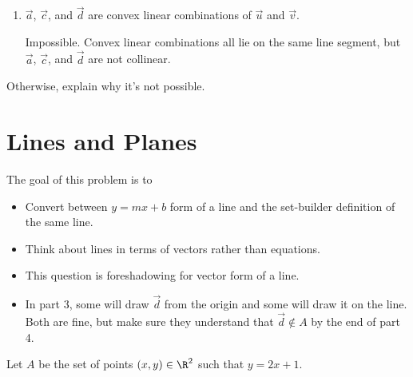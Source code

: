\documentclass{problemset}
\newcommand{\displayonlynewpage}{\begin{displayonly}\newpage\end{displayonly}}
\begin{document}
\begin{parts}
\begin{enumerate}
				\item $\vec a$, $\vec c$, and $\vec d$ are convex linear
					combinations of $\vec u$ and $\vec v$.
				\begin{solution}
					Impossible. Convex linear combinations all lie on the same line segment,
					but $\vec a$, $\vec c$, and $\vec d$ are not collinear.
				\end{solution}
			\end{enumerate}Otherwise, explain why it's not possible.
	\end{parts}

	\displayonlynewpage
\section*{Lines and Planes}

	\question
	\begin{annotation}
		\begin{goals}

			The goal of this problem is to
			\begin{itemize}
				\item Convert between $y=mx+b$ form of a line and
					the set-builder definition of the same line.
				\item Think about lines in terms of vectors rather
					than equations.
			\end{itemize}
		\end{goals}

		\begin{notes}
			\begin{itemize}
				\item This question is foreshadowing for vector form of a line.
				\item In part 3, some will draw $\vec d$ from the origin and
					some will draw it on the line. Both are fine, but make
					sure they understand that $\vec d\notin A$ by the end of
					part 4.
			\end{itemize}
		\end{notes}
	\end{annotation}
	Let $A$ be the set of points $(x,y)\in\R^2$ such that $y=2x+1$.
\end{document}
